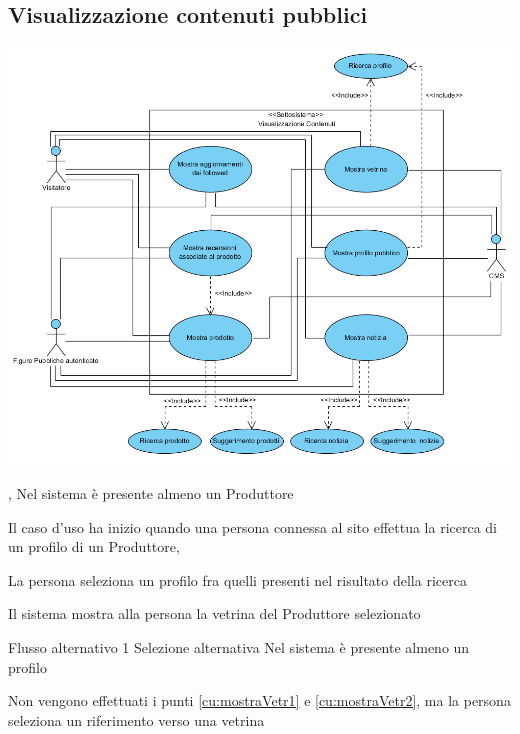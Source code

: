 \subsection{Visualizzazione contenuti pubblici}
\begin{center}
   \includegraphics[width=\textwidth]{assets/visualParadigm/Visualizzazione}
\end{center}
{, }
{Nel sistema è presente almeno un Produttore}
{\postNulle}
{\begin{enumCU}
	\item Il caso d'uso ha inizio quando una persona connessa al sito effettua la ricerca di un profilo di un Produttore, \label{cu:mostraVetr1}
	\item La persona seleziona un profilo fra quelli presenti nel risultato della ricerca\label{cu:mostraVetr2}
	\item Il sistema mostra alla persona la vetrina del Produttore selezionato
\end{enumCU}}
%
%
{Flusso alternativo 1}%
{Selezione alternativa}%
{Nel sistema è presente almeno un profilo}%
{\postNulle}%
{\begin{enumCU}
	\item Non vengono effettuati i punti \ref{cu:mostraVetr1} e \ref{cu:mostraVetr2}, ma la persona seleziona un \gls{riferimento} verso una vetrina
\end{enumCU}}%
